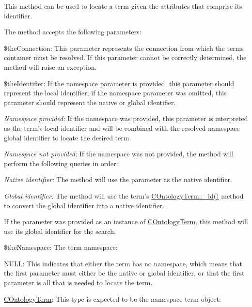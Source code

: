 This method can be used to locate a term given the attributes that comprise its identifier.

The method accepts the following parameters\-:


\begin{DoxyItemize}
\item {\ttfamily \$the\-Connection}\-: This parameter represents the connection from which the terms container must be resolved. If this parameter cannot be correctly determined, the method will raise an exception. 
\item {\ttfamily \$the\-Identifier}\-: If the namespace parameter is provided, this parameter should represent the local identifier; if the namespace parameter was omitted, this parameter should represent the native or global identifier. 
\begin{DoxyItemize}
\item {\itshape Namespace provided\-:} If the namespace was provided, this parameter is interpreted as the term's local identifier and will be combined with the resolved namespace global identifier to locate the desired term. 
\item {\itshape Namespace not provided\-:} If the namespace was not provided, the method will perform the following queries in order\-: 
\begin{DoxyItemize}
\item {\itshape Native identifier\-:} The method will use the parameter as the native identifier. 
\item {\itshape Global identifier\-:} The method will use the term's \hyperlink{class_c_ontology_term_a34f4c98f9a5b40ed2294bf4c8f6e7d0c}{C\-Ontology\-Term\-::\-\_\-id()} method to convert the global identifier into a native identifier. 
\end{DoxyItemize}If the parameter was provided as an instance of \hyperlink{class_c_ontology_term}{C\-Ontology\-Term}, this method will use its global identifier for the search. 
\end{DoxyItemize}
\item {\ttfamily \$the\-Namespace}\-: The term namespace\-: 
\begin{DoxyItemize}
\item {\ttfamily N\-U\-L\-L}\-: This indicates that either the term has no namespace, which means that the first parameter must either be the native or global identifier, or that the first parameter is all that is needed to locate the term. 
\item {\ttfamily \hyperlink{class_c_ontology_term}{C\-Ontology\-Term}}\-: This type is expected to be the namespace term object\-: 

\end{DoxyItemize}
\end{DoxyItemize}

